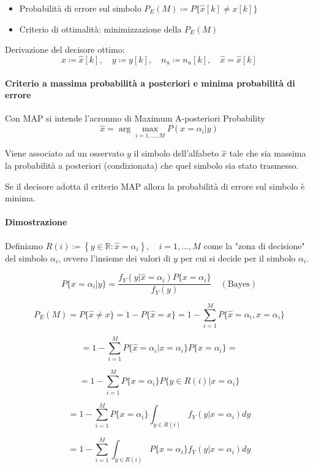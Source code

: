 \documentclass{article}
\begin{document}
\begin{itemize}
    \item Probabilità di errore sul simbolo
\(
P_E(M) \coloneqq P\{\hat{x}[k] \neq x[k]\}
\)
\item 
Criterio di ottimalità: minimizzazione della $P_E(M)$

\end{itemize}

Derivazione del decisore ottimo:
\[
x \coloneqq \hat{x}[k], \quad y \coloneqq y[k], \quad n_u \coloneqq n_u[k], \quad \hat{x} = \hat{x}[k]
\]

\paragraph{Criterio a massima probabilità a posteriori e minima probabilità di errore}
Con 
MAP si intende l'acronmo di Maximum A-posteriori Probability
\[
\hat{x} = \arg\max_{i=1,\ldots,M} P(x=\alpha_i|y)
\]

Viene associato ad un osservato $y$ il simbolo dell'alfabeto $\hat{x}$ tale che sia massima la probabilità a posteriori (condizionata) che quel simbolo sia stato trasmesso.

Se il decisore adotta il criterio MAP allora la probabilità di errore sul simbolo è minima.


\paragraph{Dimostrazione}

Definiamo 
\(
R(i) \coloneqq \left\{ y \in \mathbb{R} : \hat{x} = \alpha_i \right\}, \quad i = 1,\ldots,M
\)
come la "zona di decisione" del simbolo $\alpha_i$, ovvero l'insieme dei valori di $y$ per cui si decide per il simbolo $\alpha_i$.

\[
P\{x = \alpha_i | y\} = \frac{f_Y(y | \hat{x} = \alpha_i) P\{x = \alpha_i\}}{f_Y(y)} \quad (\text{Bayes})
\]

\[
P_E(M) = P\{\hat{x} \neq x\} = 1 - P\{\hat{x} = x\} = 1 - \sum_{i=1}^M P\{\hat{x} = \alpha_i, x = \alpha_i\}
\]

\[
= 1 - \sum_{i=1}^M P\{\hat{x} = \alpha_i | x = \alpha_i\} P\{x = \alpha_i\} =
\]

\[
= 1 - \sum_{i=1}^M P\{x = \alpha_i\} P\{y \in R(i) | x = \alpha_i\}
\]

\[
= 1 - \sum_{i=1}^M P\{x = \alpha_i\} \int_{y \in R(i)} f_Y(y | x = \alpha_i) dy
\]

\[
= 1 - \sum_{i=1}^M \int_{y \in R(i)} P\{x = \alpha_i\} f_Y(y | x = \alpha_i) dy
\]
\end{document}
